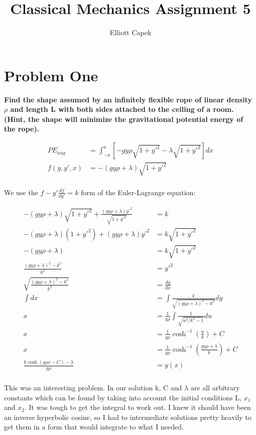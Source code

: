 \documentclass[10pt]{article} %
\title{Classical Mechanics Assignment 5}
\author{Elliott Capek}
\begin{document}
\maketitle{}

\section{Problem One}
\textbf{Find the shape assumed by an infinitely flexible rope of linear density $\rho$ and length L with both sides attached to the ceiling of a room. (Hint, the shape will minimize the gravitational potential energy of the rope).}

\begin{align*}
  PE_{aug} &= \int_{-a}^{a} \left[-gy\rho \sqrt{1 + y'^2} - \lambda\sqrt{1+y'^2}\right]dx\\
  f(y,y',x) &= -\left(gy\rho + \lambda\right)\sqrt{1 + y'^2}\\
\end{align*}

We use the $f - y'\frac{df}{dy'} = k$ form of the Euler-Lagrange equation:

\begin{align*}
  -\left(gy\rho + \lambda\right)\sqrt{1 + y'^2} + \frac{\left(gy\rho + \lambda\right)y'^2}{\sqrt{1 + y'^2}} &= k\\
  -\left(gy\rho + \lambda\right)\left(1 + y'^2\right) + \left(gy\rho + \lambda\right)y'^2 &= k\sqrt{1 + y'^2}\\
  -\left(gy\rho + \lambda\right) &= k\sqrt{1 + y'^2}\\
  \frac{\left(gy\rho + \lambda\right)^2 - k^2}{k^2} &= y'^2\\
  \sqrt{\frac{\left(gy\rho + \lambda\right)^2 - k^2}{k^2}} &= \frac{dy}{dx}\\
  \int dx &= \int \frac{k}{\sqrt{\left(gy\rho + \lambda\right)^2 - k^2}}dy\\
  x &= \frac{1}{g\rho}\int \frac{1}{\sqrt{u^2/k^2 - 1}}du\\
  x &= \frac{1}{g\rho}\cosh^{-1}\left(\frac{u}{k}\right) + C\\
  x &= \frac{1}{g\rho}\cosh^{-1}\left(\frac{gy\rho + \lambda}{k}\right) + C\\
  \frac{k\cosh(g\rho x - C) - \lambda}{g\rho} &= y(x)\\
\end{align*}

This was an interesting problem. In our solution k, C and $\lambda$ are all arbitrary constants which can be found by taking into account the initial conditions L, $x_1$ and $x_2$. It was tough to get the integral to work out. I knew it should have been an inverse hyperbolic cosine, so I had to intermediate solutions pretty heavily to get them in a form that would integrate to what I needed.\\
\end{document}
